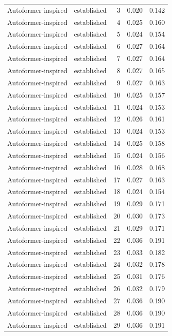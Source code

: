 \begin{tabular}{llrrr}
Autoformer-inspired & established & 3 & 0.020 & 0.142 \\
Autoformer-inspired & established & 4 & 0.025 & 0.160 \\
Autoformer-inspired & established & 5 & 0.024 & 0.154 \\
Autoformer-inspired & established & 6 & 0.027 & 0.164 \\
Autoformer-inspired & established & 7 & 0.027 & 0.164 \\
Autoformer-inspired & established & 8 & 0.027 & 0.165 \\
Autoformer-inspired & established & 9 & 0.027 & 0.163 \\
Autoformer-inspired & established & 10 & 0.025 & 0.157 \\
Autoformer-inspired & established & 11 & 0.024 & 0.153 \\
Autoformer-inspired & established & 12 & 0.026 & 0.161 \\
Autoformer-inspired & established & 13 & 0.024 & 0.153 \\
Autoformer-inspired & established & 14 & 0.025 & 0.158 \\
Autoformer-inspired & established & 15 & 0.024 & 0.156 \\
Autoformer-inspired & established & 16 & 0.028 & 0.168 \\
Autoformer-inspired & established & 17 & 0.027 & 0.163 \\
Autoformer-inspired & established & 18 & 0.024 & 0.154 \\
Autoformer-inspired & established & 19 & 0.029 & 0.171 \\
Autoformer-inspired & established & 20 & 0.030 & 0.173 \\
Autoformer-inspired & established & 21 & 0.029 & 0.171 \\
Autoformer-inspired & established & 22 & 0.036 & 0.191 \\
Autoformer-inspired & established & 23 & 0.033 & 0.182 \\
Autoformer-inspired & established & 24 & 0.032 & 0.178 \\
Autoformer-inspired & established & 25 & 0.031 & 0.176 \\
Autoformer-inspired & established & 26 & 0.032 & 0.179 \\
Autoformer-inspired & established & 27 & 0.036 & 0.190 \\
Autoformer-inspired & established & 28 & 0.036 & 0.190 \\
Autoformer-inspired & established & 29 & 0.036 & 0.191 \\

\end{tabular}
